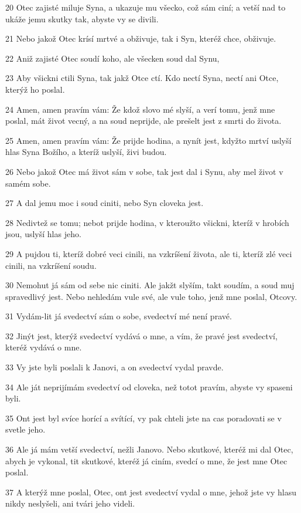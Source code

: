 \par 20 Otec zajisté miluje Syna, a ukazuje mu všecko, což sám ciní; a vetší nad to ukáže jemu skutky tak, abyste vy se divili.
\par 21 Nebo jakož Otec krísí mrtvé a obživuje, tak i Syn, kteréž chce, obživuje.
\par 22 Aniž zajisté Otec soudí koho, ale všecken soud dal Synu,
\par 23 Aby všickni ctili Syna, tak jakž Otce ctí. Kdo nectí Syna, nectí ani Otce, kterýž ho poslal.
\par 24 Amen, amen pravím vám: Že kdož slovo mé slyší, a verí tomu, jenž mne poslal, mát život vecný, a na soud neprijde, ale prešelt jest z smrti do života.
\par 25 Amen, amen pravím vám: Že prijde hodina, a nynít jest, kdyžto mrtví uslyší hlas Syna Božího, a kteríž uslyší, živi budou.
\par 26 Nebo jakož Otec má život sám v sobe, tak jest dal i Synu, aby mel život v samém sobe.
\par 27 A dal jemu moc i soud ciniti, nebo Syn cloveka jest.
\par 28 Nedivtež se tomu; nebot prijde hodina, v kteroužto všickni, kteríž v hrobích jsou, uslyší hlas jeho.
\par 29 A pujdou ti, kteríž dobré veci cinili, na vzkríšení života, ale ti, kteríž zlé veci cinili, na vzkríšení soudu.
\par 30 Nemohut já sám od sebe nic ciniti. Ale jakžt slyším, takt soudím, a soud muj spravedlivý jest. Nebo nehledám vule své, ale vule toho, jenž mne poslal, Otcovy.
\par 31 Vydám-lit já svedectví sám o sobe, svedectví mé není pravé.
\par 32 Jinýt jest, kterýž svedectví vydává o mne, a vím, že pravé jest svedectví, kteréž vydává o mne.
\par 33 Vy jste byli poslali k Janovi, a on svedectví vydal pravde.
\par 34 Ale ját neprijímám svedectví od cloveka, než totot pravím, abyste vy spaseni byli.
\par 35 Ont jest byl svíce horící a svítící, vy pak chteli jste na cas poradovati se v svetle jeho.
\par 36 Ale já mám vetší svedectví, nežli Janovo. Nebo skutkové, kteréž mi dal Otec, abych je vykonal, tit skutkové, kteréž já ciním, svedcí o mne, že jest mne Otec poslal.
\par 37 A kterýž mne poslal, Otec, ont jest svedectví vydal o mne, jehož jste vy hlasu nikdy neslyšeli, ani tvári jeho videli.
